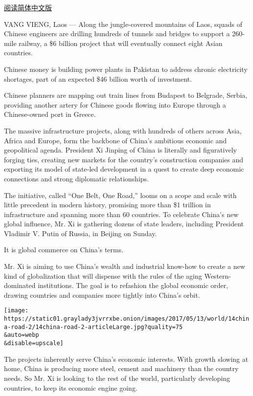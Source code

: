 \href{https://cn.nytimes3xbfgragh.onion/business/20170515/china-railway-one-belt-one-road-1-trillion-plan/}{阅读简体中文版}

VANG VIENG, Laos --- Along the jungle-covered mountains of Laos, squads
of Chinese engineers are drilling hundreds of tunnels and bridges to
support a 260-mile railway, a \$6 billion project that will eventually
connect eight Asian countries.

Chinese money is building power plants in Pakistan to address chronic
electricity shortages, part of an expected \$46 billion worth of
investment.

Chinese planners are mapping out train lines from Budapest to Belgrade,
Serbia, providing another artery for Chinese goods flowing into Europe
through a Chinese-owned port in Greece.

The massive infrastructure projects, along with hundreds of others
across Asia, Africa and Europe, form the backbone of China's ambitious
economic and geopolitical agenda. President Xi Jinping of China is
literally and figuratively forging ties, creating new markets for the
country's construction companies and exporting its model of state-led
development in a quest to create deep economic connections and strong
diplomatic relationships.

The initiative, called ``One Belt, One Road,'' looms on a scope and
scale with little precedent in modern history, promising more than \$1
trillion in infrastructure and spanning more than 60 countries. To
celebrate China's new global influence, Mr. Xi is gathering dozens of
state leaders, including President Vladimir V. Putin of Russia, in
Beijing on Sunday.

It is global commerce on China's terms.

Mr. Xi is aiming to use China's wealth and industrial know-how to create
a new kind of globalization that will dispense with the rules of the
aging Western-dominated institutions. The goal is to refashion the
global economic order, drawing countries and companies more tightly into
China's orbit.

\texttt{[image: https://static01.graylady3jvrrxbe.onion/images/2017/05/13/world/14china-road-2/14china-road-2-articleLarge.jpg?quality=75\\\&auto=webp\\\&disable=upscale]}

The projects inherently serve China's economic interests. With growth
slowing at home, China is producing more steel, cement and machinery
than the country needs. So Mr. Xi is looking to the rest of the world,
particularly developing countries, to keep its economic engine going.

